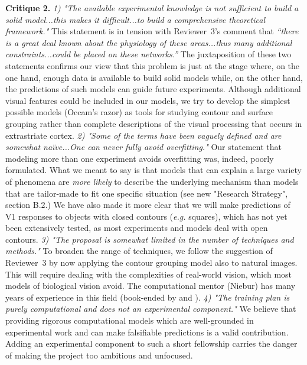 \documentclass[11pt,notitlepage]{article}
\newcommand{\eg}[0]{{\em e.g.}\xspace}
\begin{document}
\textbf{Critique 2.} \textit{1) "The available experimental knowledge
  is not sufficient to build a solid model...this makes it
  difficult...to build a comprehensive theoretical framework."}  This
statement is in tension with Reviewer~3's comment that \textit{``there
  is a great deal known about the physiology of these areas...thus
  many additional constraints...could be placed on these networks.''}
The juxtaposition of these two statements confirms our view that this
problem is just at the stage where, on the one hand, enough data is
available to build solid models while, on the other hand, the
predictions of such models can guide future experiments.  Although
additional visual features could be included in our models, we try to
develop the simplest possible models (Occam's razor) as tools for
studying contour and surface grouping rather than complete
descriptions of the visual processing that occurs in extrastriate
cortex.
%
\textit{2)
  "Some of the terms have been vaguely defined and are somewhat
  na\"{i}ve...One can never fully avoid overfitting."} 
Our statement that modeling more than one experiment avoids
overfitting was, indeed, poorly formulated. What we meant to say is that models
that can explain a large variety of phenomena are {\em more likely} to
describe the underlying mechanism than models that are tailor-made to
fit one specific situation (see new "Research Strategy", section B.2.) 
%
We have also made it more clear that we will make predictions of V1
responses to objects with closed contours (\eg squares), which has
not yet been extensively tested, as most experiments and models deal
with open contours.
% 
\textit{3) "The proposal is somewhat limited in the number of
  techniques and methods."}  To broaden the range of techniques, we
follow the suggestion of Reviewer~3 by now applying the contour
grouping model also to natural images.  This will require dealing with
the complexities of real-world vision, which most models of biological
vision avoid. The computational mentor (Niebur) has many years of
experience in this field (book-ended by \citep{Itti_etal98a} and
\citep{Russell_etal14}).
%
\textit{4) "The training plan is purely computational and does not an
  experimental component."} We believe that providing rigorous
computational models which are well-grounded in experimental work and
can make falsifiable predictions is a valid contribution. Adding an
experimental component to such a short fellowship carries the danger
of making the project too ambitious and unfocused.
\end{document}

